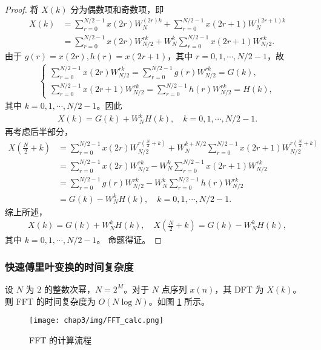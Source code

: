 \begin{proof}
    将 $X(k)$ 分为偶数项和奇数项，即
    \begin{align*}
        X(k) & = \sum_{r = 0}^{N/2 - 1}x(2r)W_N^{(2r)k}
            + \sum_{r = 0}^{N/2 - 1}x(2r + 1)W_N^{(2r + 1)k} \\
        & = \sum_{r = 0}^{N/2 - 1}x(2r)W_{N/2}^{rk}
            + W_N^k\sum_{r = 0}^{N/2 - 1}x(2r + 1)W_{N/2}^{rk}.
    \end{align*}
    由于 $g(r) = x(2r), h(r) = x(2r + 1)$，其中 $r = 0, 1, \cdots, N/2 - 1$，故
    \begin{align*}
        \begin{cases}
            \sum_{r = 0}^{N/2 - 1}x(2r)W_{N/2}^{rk}
                = \sum_{r = 0}^{N/2 - 1}g(r)W_{N/2}^{rk} = G(k), \\
            \sum_{r = 0}^{N/2 - 1}x(2r + 1)W_{N/2}^{rk}
                = \sum_{r = 0}^{N/2 - 1}h(r)W_{N/2}^{rk} = H(k),
        \end{cases}
    \end{align*}
    其中 $k = 0, 1, \cdots, N/2 - 1$。因此
    \begin{align*}
        X(k) = G(k) + W_N^kH(k), \quad k = 0, 1, \cdots, N/2 - 1.
    \end{align*}
    再考虑后半部分，
    \begin{align*}
        X\left(\frac{N}{2} + k\right) & = \sum_{r = 0}^{N/2 - 1}x(2r)W_{N/2}^{r\left(\frac{N}{2} + k\right)}
            + W_N^{k + N/2}\sum_{r = 0}^{N/2 - 1}x(2r + 1)W_{N/2}^{r\left(\frac{N}{2} + k\right)} \\
        & = \sum_{r = 0}^{N/2 - 1}x(2r)W_{N/2}^{rk}
            - W_N^k\sum_{r = 0}^{N/2 - 1}x(2r + 1)W_{N/2}^{rk} \\
        & = \sum_{r = 0}^{N/2 - 1}g(r)W_{N/2}^{rk}
            - W_N^k\sum_{r = 0}^{N/2 - 1}h(r)W_{N/2}^{rk} \\
        & = G(k) - W_N^kH(k), \quad k = 0, 1, \cdots, N/2 - 1.
    \end{align*}
    综上所述，
    \begin{align*}
        X(k) = G(k) + W_N^kH(k), \quad X\left(\frac{N}{2} + k\right) = G(k) - W_N^kH(k),
    \end{align*}
    其中 $k = 0, 1, \cdots, N/2 - 1$。
    命题得证。
\end{proof}

\subsubsection{快速傅里叶变换的时间复杂度}

\begin{theorem}
    设 $N$ 为 $2$ 的整数次幂，$N = 2^M$。对于 $N$ 点序列 $x(n)$，其 DFT 为 $X(k)$。
    则 FFT 的时间复杂度为 $O(N\log N)$。如图 \ref{fig:FFT_calc} 所示。
    \begin{figure}[H]
        \centering
        \texttt{[image: chap3/img/FFT\_calc.png]}
        \caption{FFT 的计算流程}
        \label{fig:FFT_calc}
    \end{figure}
\end{theorem}
